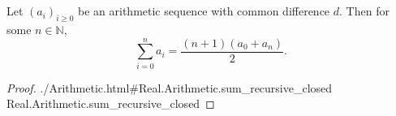 \documentclass{article}
\newcommand{\lean}[1]{\leanref
  {./Arithmetic.html\#Real.Arithmetic.#1}
  {Real.Arithmetic.#1}}
\begin{document}
\section{}%
%

Let $(a_i)_{i \geq 0}$ be an arithmetic sequence with common difference $d$.
Then for some $n \in \mathbb{N}$,
$$\sum_{i=0}^n a_i = \frac{(n + 1)(a_0 + a_n)}{2}.$$

\begin{proof}

  \lean{sum\_recursive\_closed}

\end{proof}
\end{document}
